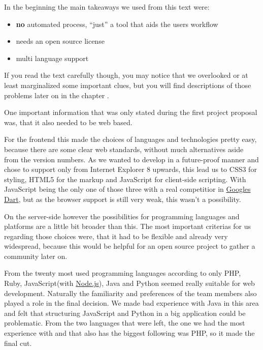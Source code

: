 In the beginning the main takeaways we used from this text were:

\begin{itemize}
\item \textbf{no} automated process, \enquote{just} a tool that aids the users workflow
\item needs an open source license
\item multi language support
\end{itemize}

If you read the text carefully though, you may notice that we 
overlooked or at least marginalized some important clues, but you 
will find descriptions of those problems later on in the chapter .

One important information that was only stated during the first project proposal was, that it also needed to be web based.

For the frontend this made the choices of languages and technologies pretty easy, because there are some clear web standards, without much alternatives aside from the version numbers. As we wanted to develop in a future-proof manner and chose to support only from Internet Explorer 8 upwards, this lead us to CSS3 for styling, HTML5 for the markup and JavaScript for client-side scripting. With JavaScript being the only one of those three with a real competitior in \href{http://www.dartlang.org/}{Googles Dart}, but as the browser support is still very weak, 
this wasn't a possibility.

On the server-side however the possibilities for programming languages and platforms are a little bit broader than this. The most
important criterias for us regarding those choices were, that it had to be flexible and already very widespread, because this would be helpful for an open source project to gather a community later on.

From the twenty most used programming languages according to \citet{tiobe} only PHP, Ruby, JavaScript(with \href{http://nodejs.org/}{Node.js}), Java and Python seemed really suitable for web development. Naturally the familiarity and preferences of the team members also played a role in the final decision. We made bad experience with Java in this area and felt that structuring JavaScript and Python in a big application could be problematic. From the two
languages that were left, the one we had the most experience with and that also has the 
biggest following was PHP, so it made the final cut.

